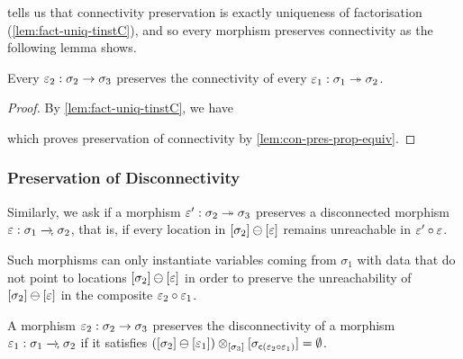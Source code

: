  tells us that connectivity preservation is exactly uniqueness of factorisation (\cref{lem:fact-uniq-tinstC}),
and so every morphism preserves connectivity as the following lemma shows.

\begin{lemma}
    Every $\varepsilon_2 : \sigma_2 \to \sigma_3$ preserves the connectivity of every $\varepsilon_1 : \sigma_1 \twoheadrightarrow \sigma_2$.
\end{lemma}
\begin{proof}
    By \cref{lem:fact-uniq-tinstC}, we have
    \begin{center}
    \end{center}
    which proves preservation of connectivity by \cref{lem:con-pres-prop-equiv}.
\end{proof}

\subsubsection{Preservation of Disconnectivity}

Similarly, we ask if a morphism $\varepsilon' : \sigma_2 \twoheadrightarrow \sigma_3$ preserves a disconnected morphism $\me : \sigma_1 \rto \sigma_2$,
that is, if every location in $[\sigma_2] \ominus [\varepsilon]$ remains unreachable in $\varepsilon' \circ \varepsilon$. 

Such morphisms can only instantiate variables coming from $\sigma_1$ with data that do not point to locations $[\sigma_2] \ominus [\varepsilon]$ in order to 
preserve the unreachability of $[\sigma_2] \ominus [\varepsilon]$ in the composite $\varepsilon_2 \circ \varepsilon_1$.

\begin{definition}\label{def:dcon-pres-morph}
    A morphism $\varepsilon_2 : \sigma_2 \to \sigma_3$ preserves the disconnectivity of a morphism $\me_1 : \sigma_1 \rto \sigma_2$
    if it satisfies $([\sigma_2] \ominus [\varepsilon_1]) \otimes_{[\sigma_3]} [\sigma_{\mathsf{c}(\varepsilon_2 \circ \varepsilon_1)}] = \emptyset$.
\end{definition}


